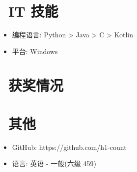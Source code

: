 \documentclass{resume}
\begin{document}

\section{\faCogs\ IT 技能}
\begin{itemize}[parsep=0.5ex]
  \item 编程语言: Python > Java > C > Kotlin
  \item 平台: Windows
\end{itemize}

\section{\faHeartO\ 获奖情况}

\section{\faInfo\ 其他}
\begin{itemize}[parsep=0.5ex]
  \item GitHub: https://github.com/h1-count
  \item 语言: 英语 - 一般(六级 459)
\end{itemize}

%
%
\end{document}
